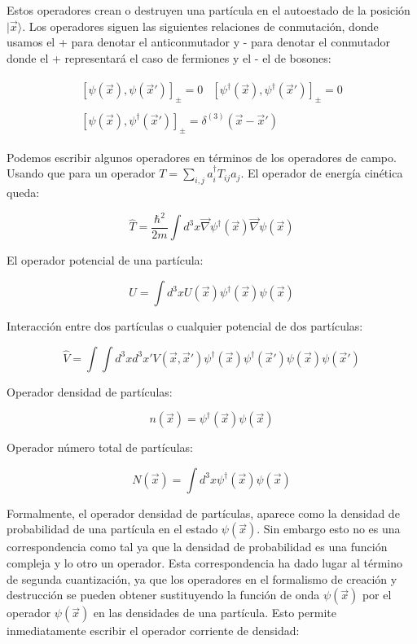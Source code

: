 \documentclass{article} %
\begin{document}
Estos operadores crean o destruyen una partícula en el autoestado de la posición $|\vec{x}\rangle$. Los operadores siguen las siguientes relaciones de conmutación, donde usamos el + para denotar el anticonmutador y - para denotar el conmutador donde el + representará el caso de fermiones y el - el de bosones:

\begin{align*}
\begin{array}{cc}
[\psi(\vec{x}), \psi(\vec{x}')]_{\pm} = 0 & [\psi^{\dagger}(\vec{x}), \psi^{\dagger}(\vec{x}')]_{\pm} = 0
\end{array} \\
\begin{array}{c}
[\psi(\vec{x}), \psi^{\dagger}(\vec{x}')]_{\pm} = \delta^{(3)} (\vec{x} - \vec{x}')
\end{array}
\end{align*}

Podemos escribir algunos operadores en términos de los operadores de campo. Usando que para un operador $T = \sum_{i,j} a_i^{\dagger} T_{ij} a_j$. El operador de energía cinética queda:

$$
\hat{T} = \frac{\hbar^2}{2m} \int d^3 x \vec{\nabla} \psi^{\dagger} (\vec{x}) \vec{\nabla} \psi(\vec{x})
$$

El operador potencial de una partícula:

$$
\hat{U} = \int d^3x U(\vec{x}) \psi^{\dagger} (\vec{x}) \psi(\vec{x})
$$

Interacción entre dos partículas o cualquier potencial de dos partículas:

$$
\hat{V} = \int \int d^3xd^3x' V(\vec{x}, \vec{x}') \psi^{\dagger} (\vec{x}) \psi^{\dagger} (\vec{x}') \psi(\vec{x}) \psi(\vec{x}')
$$

Operador densidad de partículas:

$$
n(\vec{x}) = \psi^{\dagger} (\vec{x}) \psi(\vec{x})
$$

Operador número total de partículas:

$$
N(\vec{x}) = \int d^3x \psi^{\dagger} (\vec{x}) \psi(\vec{x})
$$

Formalmente, el operador densidad de partículas, aparece como la densidad de probabilidad de una partícula en el estado $\psi(\vec{x})$. Sin embargo esto no es una correspondencia como tal ya que la densidad de probabilidad es una función compleja y lo otro un operador. Esta correspondencia ha dado lugar al término de segunda cuantización, ya que los operadores en el formalismo de creación y destrucción se pueden obtener sustituyendo la función de onda $\psi(\vec{x})$ por el operador $\psi(\vec{x})$ en las densidades de una partícula. Esto permite inmediatamente escribir el operador corriente de densidad:
\end{document}
